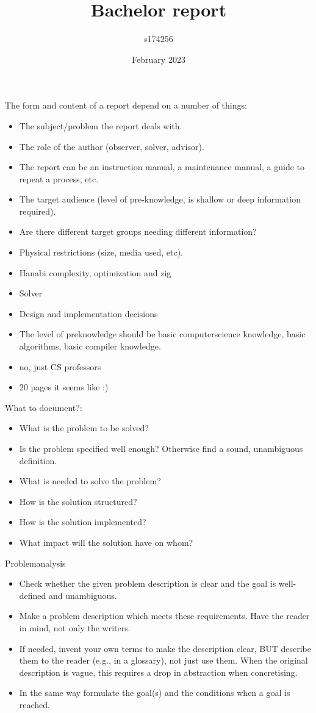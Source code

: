 \documentclass{article}
\title{Bachelor report}
\author{s174256 }
\date{February 2023}
\newcommand{\ninanotes}[1]{{\color{red} #1}}
\newcommand{\mytodonswer}[1]{{\color{brown} #1}}
\begin{document}
\ninanotes{
The form and content of a report depend on a number of things:
\begin{itemize}
\item The subject/problem the report deals with.
\item The role of the author (observer, solver, advisor).
\item The report can be an instruction manual, a maintenance manual, a guide to repeat a process, etc.
\item The target audience (level of pre-knowledge, is shallow or deep information required).
\item Are there different target groups needing different information?
\item Physical restrictions (size, media used, etc).
\end{itemize}

\mytodonswer{
	\begin{itemize}
\item Hanabi complexity, optimization and zig
\item Solver
\item Design and implementation decisions
\item The level of preknowledge should be basic computerscience knowledge, basic algorithms, basic compiler knowledge.
\item no, just CS professors
\item 20 pages it seems like :)
	\end{itemize}

}

What to document?:
\begin{itemize}
	\item What is the problem to be solved?
	\item Is the problem specified well enough? Otherwise find a sound,
unambiguous definition.
\item What is needed to solve the problem?
\item How is the solution structured?
\item How is the solution implemented?
\item What impact will the solution have on whom?
\end{itemize}

Problemanalysis
\begin{itemize}
\item Check whether the given problem description is clear and the goal is
well-defined and unambiguous.
\item Make a problem description which meets these requirements. Have the
reader in mind, not only the writers.
\item If needed, invent your own terms to make the description clear, BUT
describe them to the reader (e.g., in a glossary), not just use them.
When the original description is vague, this requires a drop in
abstraction when concretising.
\item In the same way formulate the goal(s) and the conditions when a goal is
reached.
\end{itemize}
}
\end{document}
